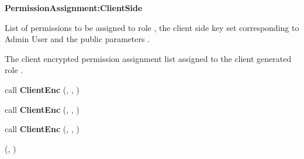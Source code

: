 \documentclass[final,5p,times,twocolumn]{elsarticle}
\newcommand{\algofontsize}{\fontsize{7}{8}\selectfont}
\begin{document}
\begin{algorithm}[htp]
{\algofontsize
\caption{\textbf{PermissionAssignment:ClientSide}}

\label{algo:deploy-permission-assignment-client-side}

\begin{algorithmic}[1]

\REQUIRE List of permissions  to be assigned to role , the client side key set  corresponding to Admin User  and the public parameters .

\ENSURE The client encrypted permission assignment list  assigned to the client generated role .

\medskip

\STATE  call \textbf{ClientEnc} (, , ) \label{line:deploy-pa-cs-role}

\STATE  \label{line:deploy-pa-cs-init}

 \label{line:deploy-pa-cs-loop}

	\STATE  call \textbf{ClientEnc} (, , ) \label{line:deploy-pa-cs-action}
	
	\STATE  call \textbf{ClientEnc} (, , ) \label{line:deploy-pa-cs-target}
	
	\STATE  \label{line:deploy-pa-cs-update}

\ENDFOR

\RETURN (, )

\end{algorithmic}
}
\end{algorithm}
\end{document}
